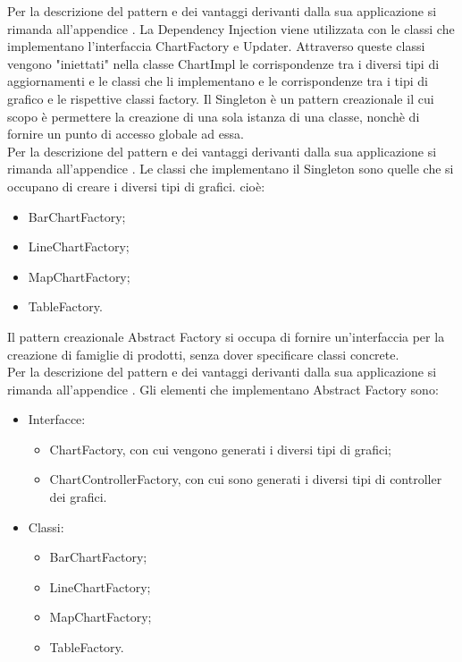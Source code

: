 	Per la descrizione del pattern e dei vantaggi derivanti dalla sua applicazione si rimanda all'appendice .
	La Dependency Injection viene utilizzata con le classi che implementano l'interfaccia ChartFactory e Updater. Attraverso queste classi vengono "iniettati" nella classe ChartImpl le corrispondenze tra i diversi tipi di aggiornamenti e le classi che li implementano e le corrispondenze tra i tipi di grafico e le rispettive classi factory.
	Il Singleton è un pattern creazionale il cui scopo è permettere la creazione di una sola istanza di una classe, nonchè di fornire un punto di accesso globale ad essa.\\
	Per la descrizione del pattern e dei vantaggi derivanti dalla sua applicazione si rimanda all'appendice .
	Le classi che implementano il Singleton sono quelle che si occupano di creare i diversi tipi di grafici. cioè:
	\begin{itemize}
	\item BarChartFactory;
	\item LineChartFactory;
	\item MapChartFactory;
	\item TableFactory.
	\end{itemize}
	Il pattern creazionale Abstract Factory si occupa di fornire un'interfaccia per la creazione di famiglie di prodotti, senza dover specificare classi concrete. \\
	Per la descrizione del pattern e dei vantaggi derivanti dalla sua applicazione si rimanda all'appendice .
	Gli elementi che implementano Abstract Factory sono:
	\begin{itemize}
	\item Interfacce:
		\begin{itemize}
			\item ChartFactory, con cui vengono generati i diversi tipi di grafici;
			\item ChartControllerFactory, con cui sono generati i diversi tipi di controller dei grafici.
		\end{itemize}
	\item Classi:
		\begin{itemize}
			\item BarChartFactory;
			\item LineChartFactory;
			\item MapChartFactory;
			\item TableFactory.
		\end{itemize}
	\end{itemize}
